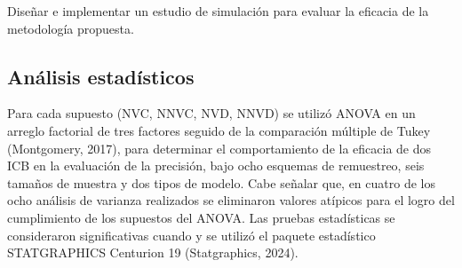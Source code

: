 Diseñar e implementar un estudio de simulación para evaluar la eficacia de la metodología propuesta.
	 \vspace{1.5cm}
	 	 
	 	 
	 	 
	 	 
\subsection{Análisis estadísticos}
Para cada supuesto (NVC, NNVC, NVD, NNVD) se utilizó ANOVA en un arreglo factorial de tres factores seguido de la comparación múltiple de Tukey (Montgomery, 2017), para determinar el comportamiento de la eficacia de dos ICB en la evaluación de la precisión, bajo ocho esquemas de remuestreo, seis tamaños de muestra y dos tipos de modelo. Cabe señalar que, en cuatro de los ocho análisis de varianza realizados se eliminaron valores atípicos para el logro del cumplimiento de los supuestos del ANOVA.
Las pruebas estadísticas se consideraron significativas cuando  y se utilizó el paquete estadístico STATGRAPHICS Centurion 19 (Statgraphics, 2024).




